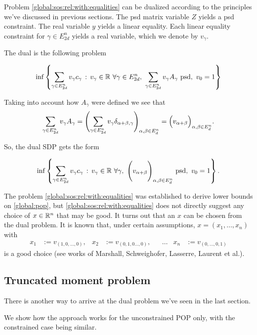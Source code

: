 Problem \eqref{global:sos:rel:with:equalities} can be dualized according to the principles we've discussed in previous sections.  The psd matrix variable $Z$ yields a psd constraint. The real variable $y$ yields a linear equality. Each linear equality constraint for $\gamma \in E_{2d}^n$ yields a real variable, which we denote by $v_\gamma$.


The dual is the following problem

\[
	\inf \setcond{ \sum_{\gamma \in E^n_{2d} } v_\gamma c_\gamma }{v_\gamma \in \R \ \forall \gamma \in E^n_{2d}, \ \sum_{\gamma \in E^n_{2d}} v_\gamma A_\gamma \ \text{psd}, \ v_0 = 1}
\]

Taking into account how $A_\gamma$ were defined we see that 
\[
	\sum_{\gamma \in E^n_{2d}} v_\gamma A_\gamma = \Biggl( \sum_{\gamma \in E^n_{2d}} v_\gamma \delta_{\alpha + \beta,\gamma} \Biggr)_{\alpha, \beta \in E^n_d} = \Bigl( v_{\alpha+ \beta} \Bigr)_{\alpha, \beta \in E^n_d}.
\]

So, the dual SDP gets the form

\[
	\inf \setcond{ \sum_{\gamma \in E^n_{2d}} v_\gamma c_\gamma }{v_\gamma \in \R \ \forall \gamma, \ \Biggl(v_{\alpha+\beta}\Biggr)_{\alpha, \beta \in E^n_d} \ \text{psd}, \ v_0 = 1}.
\]

\begin{remark}
The problem \eqref{global:sos:rel:with:equalities} was established to derive lower bounds on \eqref{global:pop}, but \eqref{global:sos:rel:with:equalities} does not directly suggest any choice of $x \in \mathbb{R}^n$ that may be good. It turns out that an $x$ can be chosen from the dual problem. It is known that, under certain assumptions, $x=(x_1,\ldots,x_n)$ with 
\begin{align*}
 x_1 & := v_{(1,0,\ldots,0)}, & x_2 & := v_{(0,1,0\ldots,0)}, & & \ldots & x_n & := v_{(0,\ldots,0,1)}
\end{align*}
is a good choice (see works of Marshall, Schweighofer, Lasserre, Laurent et al.). 
\end{remark}

\subsection{Truncated moment problem}

There is another way to arrive at the dual problem we've seen in the last section. 

We show how the approach works for the unconstrained POP only, with the constrained case being similar.

